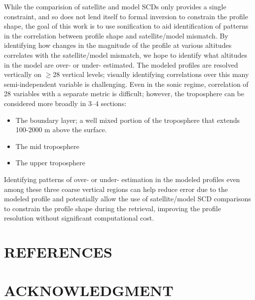 \documentclass[a4paper,10pt,oneside]{article}
\begin{document}
\begin{sloppy}
While the comparision of satellite and model SCDs only provides a single constraint, and so does not lend itself to formal inversion to constrain the profile shape, the goal of this work is to use sonification to aid identification of patterns in the correlation between profile shape and satellite/model mismatch. By identifying how changes in the magnitude of the profile at various altitudes correlates with the satellite/model mismatch, we hope to identify what altitudes in the model are over- or under- estimated. The modeled profiles are resolved vertically on $\geq 28$ vertical levels; visually identifying correlations over this many semi-independent variable is challenging. Even in the sonic regime, correlation of 28 variables with a separate metric is difficult; however, the troposphere can be considered more broadly in 3--4 sections:
	\begin{itemize}
	\item The boundary layer; a well mixed portion of the troposphere that extends 100-2000 m above the surface.
	\item The mid troposphere
	\item The upper troposphere
	\end{itemize}
	Identifying patterns of over- or under- estimation in the modeled profiles even among these three coarse vertical regions can help reduce error due to the modeled profile and potentially allow the use of satellite/model SCD comparisons to constrain the profile shape during the retrieval, improving the profile resolution without significant computational cost.


\section{REFERENCES}
\label{sec:ref}


\section{ACKNOWLEDGMENT}
\label{sec:ack}




%
% 
%
% 

\end{sloppy}
\end{document}
